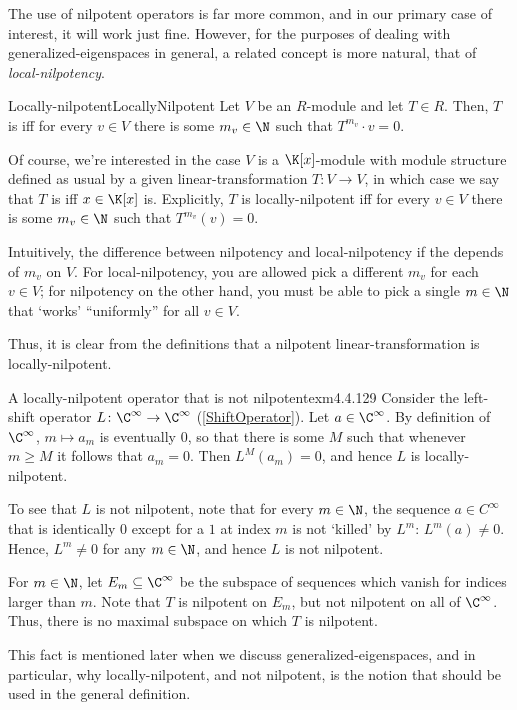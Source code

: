 The use of nilpotent operators is far more common, and in our primary case of interest, it will work just fine.  However, for the purposes of dealing with generalized-eigenspaces in general, a related concept is more natural, that of \emph{local-nilpotency}.
\begin{dfn}{Locally-nilpotent}{LocallyNilpotent}
	Let $V$ be an $R$-module and let $T\in R$.  Then, $T$ is  iff for every $v\in V$ there is some $m_v\in \N$ such that $T^{m_v}\cdot v=0$.
	\begin{rmk}
		Of course, we're interested in the case $V$ is a $\K [x]$-module with module structure defined as usual by a given linear-transformation $T\colon V\rightarrow V$, in which case we say that $T$ is  iff $x\in \K[x]$ is.  Explicitly, $T$ is locally-nilpotent iff for every $v\in V$ there is some $m_v\in \N$ such that $T^{m_v}(v)=0$.
	\end{rmk}
	\begin{rmk}
		Intuitively, the difference between nilpotency and local-nilpotency if the depends of $m_v$ on $V$.  For local-nilpotency, you are allowed pick a different $m_v$ for each $v\in V$; for nilpotency on the other hand, you must be able to pick a single $m\in \N$ that `works' ``uniformly'' for all $v\in V$.
		
		Thus, it is clear from the definitions that a nilpotent linear-transformation is locally-nilpotent.
	\end{rmk}
\end{dfn}
\begin{exm}{A locally-nilpotent operator that is not nilpotent}{exm4.4.129}
	Consider the left-shift operator $L\colon \C ^{\infty}\rightarrow \C ^{\infty}$ (\cref{ShiftOperator}).  Let $a\in \C ^{\infty}$.  By definition of $\C ^{\infty}$, $m\mapsto a_m$ is eventually $0$, so that there is some $M$ such that whenever $m\geq M$ it follows that $a_m=0$.  Then $L^M(a_m)=0$, and hence $L$ is locally-nilpotent.
	
	To see that $L$ is not nilpotent, note that for every $m\in \N$, the sequence $a\in C^{\infty}$ that is identically $0$ except for a $1$ at index $m$ is not `killed' by $L^m$:  $L^m(a)\neq 0$.  Hence, $L^m\neq 0$ for any $m\in \N$, and hence $L$ is not nilpotent.
	
	\horizontalrule
	
	For $m\in \N$, let $E_m\subseteq \C ^{\infty}$ be the subspace of sequences which vanish for indices larger than $m$.  Note that $T$ is nilpotent on $E_m$, but not nilpotent on all of $\C ^{\infty}$.  Thus, there is no maximal subspace on which $T$ is nilpotent.
	\begin{rmk}
		This fact is mentioned later when we discuss generalized-eigenspaces, and in particular, why locally-nilpotent, and not nilpotent, is the notion that should be used in the general definition.
	\end{rmk}
\end{exm}
